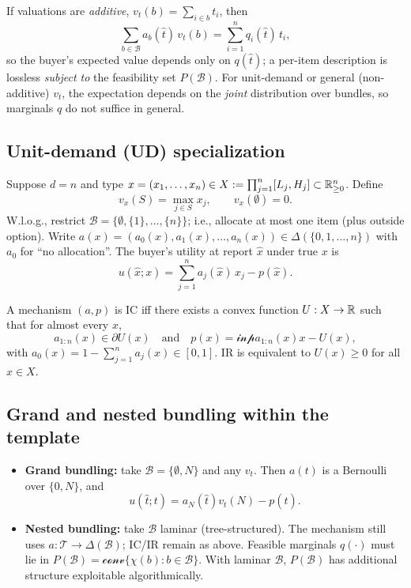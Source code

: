 \documentclass[dvipdfmx,autodetect-engine]{article}
\newcommand{\B}{\mathcal{B}}
\newcommand{\conv}{\mathcal{conv}}
\newcommand{\inp}{\mathcal{inp}}
\begin{document}
\begin{remark}
If valuations are \emph{additive}, $v_t(b)=\sum_{i\in b} t_i$, then
\[
\sum_{b\in\B} a_b(\hat t)\,v_t(b)=\sum_{i=1}^n q_i(\hat t)\,t_i,
\]
so the buyer's expected value depends only on $q(\hat t)$; a per-item description is lossless \emph{subject to} the feasibility set $P(\B)$.
For unit-demand or general (non-additive) $v_t$, the expectation depends on the \emph{joint} distribution over bundles, so marginals $q$ do not suffice in general.
\end{remark}

\subsection*{Unit-demand (UD) specialization}
Suppose $d=n$ and type $x=(x_1,\dots,x_n)\in X:=\prod_{j=1}^n [L_j,H_j]\subset \mathbb{R}_{\ge 0}^n$. Define
\[
v_x(S)=\max_{j\in S} x_j,\qquad v_x(\emptyset)=0.
\]
W.l.o.g., restrict $\B=\{\emptyset,\{1\},\dots,\{n\}\}$; i.e., allocate at most one item (plus outside option).
Write $a(x)=(a_0(x),a_1(x),\dots,a_n(x))\in\Delta(\{0,1,\dots,n\})$ with $a_0$ for ``no allocation''.
The buyer's utility at report $\hat x$ under true $x$ is
\[
u(\hat x;x)=\sum_{j=1}^n a_j(\hat x)\,x_j - p(\hat x).
\]

\begin{theorem}
A mechanism $(a,p)$ is IC iff there exists a convex function $U:X\to\mathbb{R}$ such that for almost every $x$,
\[
a_{1:n}(x)\in \partial U(x)\quad\text{and}\quad p(x)=\inp{a_{1:n}(x)}{x}-U(x),
\]
with $a_0(x)=1-\sum_{j=1}^n a_j(x)\in[0,1]$.
IR is equivalent to $U(x)\ge 0$ for all $x\in X$.
\end{theorem}

\subsection*{Grand and nested bundling within the template}

\begin{itemize}
  \item \textbf{Grand bundling:} take $\B=\{\emptyset,N\}$ and any $v_t$.
  Then $a(t)$ is a Bernoulli over $\{0,N\}$, and 
  \[
    u(\hat t;t) = a_N(\hat t)v_t(N) - p(\hat t).
  \]
  \item \textbf{Nested bundling:} take $\B$ laminar (tree-structured).
  The mechanism still uses $a:\mathcal{T}\to\Delta(\B)$; IC/IR remain as above.
  Feasible marginals $q(\cdot)$ must lie in $P(\B)=\conv\{\chi(b):b\in\B\}$.
  With laminar $\B$, $P(\B)$ has additional structure exploitable algorithmically.
\end{itemize}
\end{document}
